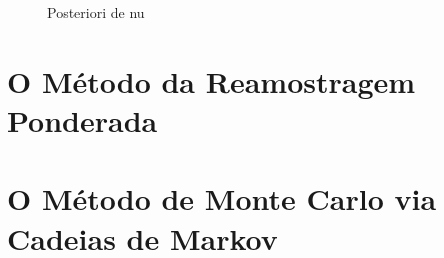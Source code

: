 \documentclass[12pt,reqno,a4paper,oneside, titlepage]{article}
\begin{document}
\begin{figure}[!htb]
	\centering
	\caption{Posteriori de nu}
	\label{fig:post_nu}
\end{figure}

\section{O Método da Reamostragem Ponderada}\label{sir}


\section{O Método de Monte Carlo via Cadeias de Markov}\label{mcmc}




\end{document}
